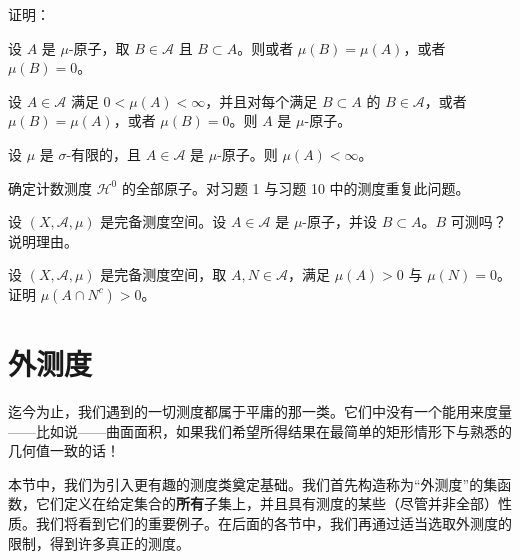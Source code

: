 \begin{exercises}
\begin{items}
\item

证明：

\begin{subitems}
\item

设 $ A $ 是 $ \mu $-原子，取 $ B \in \mathcal{A} $ 且 $ B \subset A $。则或者 $ \mu(B) = \mu(A) $，或者 $ \mu(B) = 0 $。

\item

设 $ A \in \mathcal{A} $ 满足 $ 0 < \mu(A) < \infty $，并且对每个满足 $ B \subset A $ 的 $ B \in \mathcal{A} $，或者 $ \mu(B) = \mu(A) $，或者 $ \mu(B) = 0 $。则 $ A $ 是 $ \mu $-原子。

\item

设 $ \mu $ 是 $ \sigma $-有限的，且 $ A \in \mathcal{A} $ 是 $ \mu $-原子。则 $ \mu(A) < \infty $。

\end{subitems}

\item

确定计数测度 $ \mathcal{H}^{0} $ 的全部原子。对习题 1 与习题 10 中的测度重复此问题。

\end{items}

\item

设 $ (X, \mathcal{A}, \mu) $ 是完备测度空间。设 $ A \in \mathcal{A} $ 是 $ \mu $-原子，并设 $ B \subset A $。$ B $ 可测吗？说明理由。

\item

设 $ (X, \mathcal{A}, \mu) $ 是完备测度空间，取 $ A, N \in \mathcal{A} $，满足 $ \mu(A) > 0 $ 与 $ \mu(N) = 0 $。证明 $ \mu(A \cap N^{c}) > 0 $。

\end{exercises}

\section{外测度}

迄今为止，我们遇到的一切测度都属于平庸的那一类。它们中没有一个能用来度量——比如说——曲面面积，如果我们希望所得结果在最简单的矩形情形下与熟悉的几何值一致的话！

本节中，我们为引入更有趣的测度类奠定基础。我们首先构造称为“外测度”的集函数，它们定义在给定集合的\textbf{所有}子集上，并且具有测度的某些（尽管并非全部）性质。我们将看到它们的重要例子。在后面的各节中，我们再通过适当选取外测度的限制，得到许多真正的测度。

